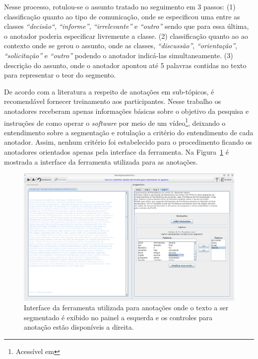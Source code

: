 Nesse processo, rotulou-se o assunto tratado no seguimento em 3 passos:
(1) classificação quanto ao tipo de comunicação, onde se especificou uma entre as classes 
\textit{``decisão``},
\textit{``informe''},
\textit{``irrelevante''} e 
\textit{``outro''} sendo que para essa última, o anotador poderia especificar livremente a classe.
(2) classificação quanto ao ao contexto onde se gerou o assunto, onde as classes, 
\textit{``discussão''},
\textit{``orientação''},
\textit{``solicitação''} e 
\textit{``outro''} podendo o anotador indicá-las simultaneamente.
(3) descrição do assunto, onde o anotador apontou até 5 palavras contidas no texto para representar o teor do segmento.

De acordo com a literatura a respeito de anotações em sub-tópicos, é recomendável fornecer treinamento aos participantes. Nesse trabalho os anotadores receberam apenas informações básicas sobre o objetivo da pesquisa e instruções de como operar o \textit{software} por meio de um vídeo\footnote{Acessível em }, deixando o entendimento sobre a segmentação e rotulação a critério do entendimento de cada anotador. Assim, nenhum critério foi estabelecido para o procedimento ficando os anotadores orientados apenas pela interface da ferramenta. Na Figura~\ref{fig:interfaceanotacoes} é mostrada a interface da ferramenta utilizada para as anotações.

  \begin{figure}[!h]
	  \centering
	  \includegraphics[width=1\textwidth]{conteudo/capitulos/figs/interface-anotacoes.png}
	  \caption{Interface da ferramenta utilizada para anotações onde o texto a ser segmentado é exibido no painel a esquerda e os controles para anotação estão disponíveis a direita.}
	  \label{fig:interfaceanotacoes}
  \end{figure}



